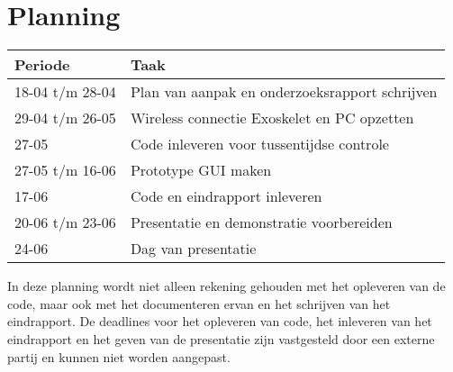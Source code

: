 \section{Planning}
{\renewcommand{\arraystretch}{1.5}
\begin{tabular}{ | l | l | }
	\hline
	\bfseries{Periode} & \bfseries{Taak} \\ \hline
	18-04 t/m 28-04 & Plan van aanpak en onderzoeksrapport schrijven\\ \hline
	29-04 t/m 26-05 & Wireless connectie Exoskelet en PC opzetten   \\ \hline
	27-05 & Code inleveren voor tussentijdse controle \\ \hline 
	27-05 t/m 16-06 & Prototype GUI maken \\ \hline
	17-06 & Code en eindrapport inleveren \\ \hline
	20-06 t/m 23-06 & Presentatie en demonstratie voorbereiden \\ \hline
	24-06 & Dag van presentatie \\ \hline
\end{tabular}
}

In deze planning wordt niet alleen rekening gehouden met het opleveren van de code, maar ook met het documenteren ervan en het schrijven van het eindrapport. De deadlines voor het opleveren van code, het inleveren van het eindrapport en het geven van de presentatie zijn vastgesteld door een externe partij en kunnen niet worden aangepast.

